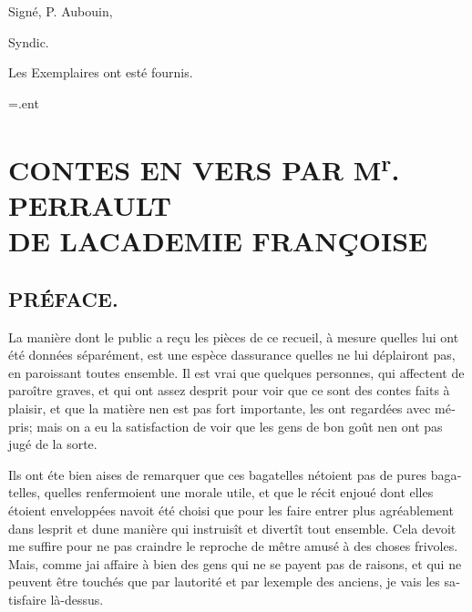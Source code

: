\documentclass[14pt,a4paper]{memoir}
\makeatletter
\newcommand{\resetpagenotes}{%
  \immediate\closeout\@notefile
  \immediate\openout\@notefile=\jobname.ent
  \setcounter{pagenote}{0}
}
\makeatother
\begin{document}
{{\begin{otherlanguage}{french}
\begin{itshape}
\begin{flushright}
Signé, {P. Aubouin},

Syndic.

Les Exemplaires ont esté fournis.
\end{flushright}
\end{itshape}

\clearpage
\resetpagenotes

\part[CONTES EN VERS PAR M\textsuperscript{{r}}. PIERRAULT]{CONTES EN VERS PAR M\textsuperscript{{r}}. PERRAULT\\ [1ex] \large DE L\textquotesingle ACADEMIE FRANÇOISE}

\chapter{PRÉFACE.}
La manière dont le public a reçu les pièces de ce recueil, à mesure
qu\textquotesingle elles lui ont été données séparément, est une espèce
d\textquotesingle assurance qu\textquotesingle elles ne lui déplairont
pas, en paroissant toutes ensemble. Il est vrai que quelques personnes,
qui affectent de paroître graves, et qui ont assez
d\textquotesingle esprit pour voir que ce sont des contes faits à
plaisir, et que la matière n\textquotesingle en est pas fort importante,
les ont regardées avec mépris; mais on a eu la satisfaction de voir que
les gens de bon goût n\textquotesingle en ont pas jugé de la sorte.

Ils ont éte bien aises de remarquer que ces bagatelles
n\textquotesingle étoient pas de pures bagatelles,
qu\textquotesingle elles renfermoient une morale utile, et que le récit
enjoué dont elles étoient enveloppées n\textquotesingle avoit été choisi
que pour les faire entrer plus agréablement dans
l\textquotesingle esprit et d\textquotesingle une manière qui instruisît
et divertît tout ensemble. Cela devoit me suffire pour ne pas craindre
le reproche de m\textquotesingle être amusé à des choses frivoles. Mais,
comme j\textquotesingle ai affaire à bien des gens qui ne se payent pas
de raisons, et qui ne peuvent être touchés que par
l\textquotesingle autorité et par l\textquotesingle exemple des anciens,
je vais les satisfaire là-dessus.


\end{otherlanguage}}}
\end{document}
